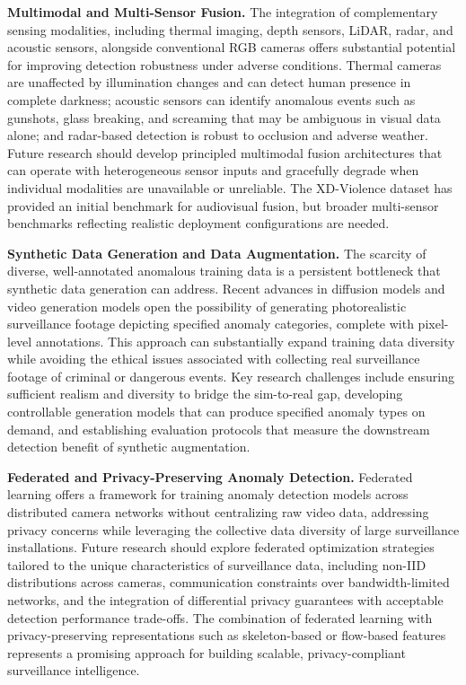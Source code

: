 \documentclass[10pt,a4paper]{article}
\begin{document}
\noindent\textbf{Multimodal and Multi-Sensor Fusion.} The integration of complementary sensing modalities, including thermal imaging, depth sensors, LiDAR, radar, and acoustic sensors, alongside conventional RGB cameras offers substantial potential for improving detection robustness under adverse conditions. Thermal cameras are unaffected by illumination changes and can detect human presence in complete darkness; acoustic sensors can identify anomalous events such as gunshots, glass breaking, and screaming that may be ambiguous in visual data alone; and radar-based detection is robust to occlusion and adverse weather. Future research should develop principled multimodal fusion architectures that can operate with heterogeneous sensor inputs and gracefully degrade when individual modalities are unavailable or unreliable. The XD-Violence dataset has provided an initial benchmark for audiovisual fusion, but broader multi-sensor benchmarks reflecting realistic deployment configurations are needed.

\noindent\textbf{Synthetic Data Generation and Data Augmentation.} The scarcity of diverse, well-annotated anomalous training data is a persistent bottleneck that synthetic data generation can address. Recent advances in diffusion models and video generation models open the possibility of generating photorealistic surveillance footage depicting specified anomaly categories, complete with pixel-level annotations. This approach can substantially expand training data diversity while avoiding the ethical issues associated with collecting real surveillance footage of criminal or dangerous events. Key research challenges include ensuring sufficient realism and diversity to bridge the sim-to-real gap, developing controllable generation models that can produce specified anomaly types on demand, and establishing evaluation protocols that measure the downstream detection benefit of synthetic augmentation.

\noindent\textbf{Federated and Privacy-Preserving Anomaly Detection.} Federated learning offers a framework for training anomaly detection models across distributed camera networks without centralizing raw video data, addressing privacy concerns while leveraging the collective data diversity of large surveillance installations. Future research should explore federated optimization strategies tailored to the unique characteristics of surveillance data, including non-IID distributions across cameras, communication constraints over bandwidth-limited networks, and the integration of differential privacy guarantees with acceptable detection performance trade-offs. The combination of federated learning with privacy-preserving representations such as skeleton-based or flow-based features represents a promising approach for building scalable, privacy-compliant surveillance intelligence.
\end{document}
